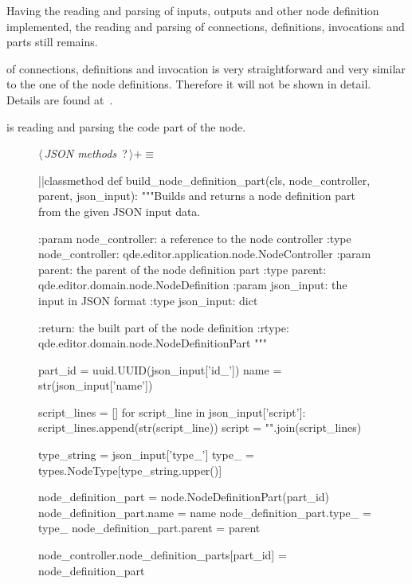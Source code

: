 \documentclass[%
    a4paper,    %
    justified,  %
    nobib,      %
    openany     %
]{tufte-book}
\begin{document}
Having the reading and parsing of inputs, outputs and other node definition
implemented, the reading and parsing of connections, definitions, invocations
and parts still remains.

 of connections, definitions and invocation
is very straightforward and very similar to the one of the node definitions.
Therefore it will not be shown in detail. Details are found at~.

 is reading and parsing
the code part of the node.

\begin{figure}
\begin{flushleft} \small
\begin{minipage}{\linewidth}\label{scrap145}\raggedright\small
{} $\langle\,${\itshape JSON methods}\nobreak\ {\footnotesize {?}}$\,\rangle+\equiv$
\vspace{-1ex}
\begin{pythoncode}
|\normalfont{}\fontfamily{}|classmethod
def build_node_definition_part(cls, node_controller, parent, json_input):
    """Builds and returns a node definition part from the given JSON input data.

    :param node_controller: a reference to the node controller
    :type  node_controller: qde.editor.application.node.NodeController
    :param parent: the parent of the node definition part
    :type  parent: qde.editor.domain.node.NodeDefinition
    :param json_input: the input in JSON format
    :type  json_input: dict

    :return: the built part of the node definition
    :rtype:  qde.editor.domain.node.NodeDefinitionPart
    """

    part_id         = uuid.UUID(json_input['id_'])
    name            = str(json_input['name'])

    script_lines = []
    for script_line in json_input['script']:
        script_lines.append(str(script_line))
    script = "\n".join(script_lines)

    type_string = json_input['type_']
    type_ = types.NodeType[type_string.upper()]

    node_definition_part = node.NodeDefinitionPart(part_id)
    node_definition_part.name = name
    node_definition_part.type_ = type_
    node_definition_part.parent = parent

    node_controller.node_definition_parts[part_id] = node_definition_part


\end{pythoncode}
\end{minipage}
\end{flushleft}
\end{figure}
\end{document}
